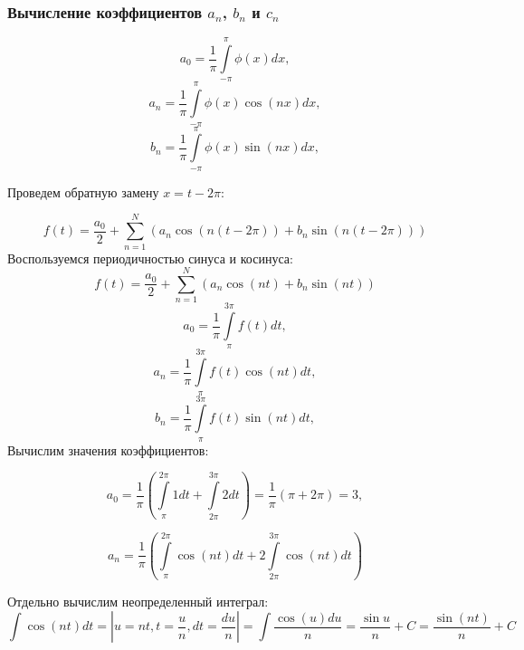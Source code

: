 \documentclass[a5paper, 10pt]{article}
\theoremstyle{definition}
\theoremstyle{plain}
\theoremstyle{remark}
\begin{document}
\subsubsection{Вычисление коэффициентов $a_n$, $b_n$ и $c_n$}
\begin{equation}
a_0 = \frac{1}{\pi} \int \limits_{-\pi}^{\pi} \phi (x) dx,
\end{equation}
\begin{equation}
a_n = \frac{1}{\pi} \int \limits_{-\pi}^{\pi} \phi (x) \cos (n x) dx,
\end{equation}
\begin{equation}
b_n = \frac{1}{\pi} \int \limits_{-\pi}^{\pi} \phi (x) \sin (nx) dx,
\end{equation}

Проведем обратную замену $x = t - 2\pi$:

\begin{equation}
f(t) = \frac{a_0}{2} + \sum  \limits_{n=1}^N \left( a_n \cos \left( n ( t - 2\pi) \right) + b_n \sin \left( n ( t - 2\pi) \right)  \right)
\end{equation}
Воспользуемся периодичностью синуса и косинуса:
\begin{equation}
f(t) = \frac{a_0}{2} + \sum  \limits_{n=1}^N \left( a_n \cos \left( n t  \right) + b_n \sin \left( n  t  \right)  \right)
\end{equation}
\begin{equation}
a_0 = \frac{1}{\pi} \int \limits_{\pi}^{3\pi} f(t) dt,
\end{equation}
\begin{equation}
a_n = \frac{1}{\pi} \int \limits_{\pi}^{3\pi} f(t) \cos (n t) dt,
\end{equation}
\begin{equation}
b_n = \frac{1}{\pi} \int \limits_{\pi}^{3\pi} f(t) \sin (nt) dt,
\end{equation}
Вычислим значения коэффициентов:

\begin{equation}
a_0 = \frac{1}{\pi} \left( \int \limits_{\pi}^{2\pi} 1 dt + \int \limits_{2\pi}^{3\pi} 2 dt\right) =
 \frac{1}{\pi} \left( \pi + 2\pi \right) = 3,
\end{equation}

\begin{equation}
a_n = \frac{1}{\pi} \left( \int \limits_{\pi}^{2\pi} \cos (n t) dt +  2\int \limits_{2\pi}^{3\pi} \cos (n t) dt \right)
\end{equation}

Отдельно вычислим неопределенный интеграл:
\begin{equation}
\int \cos (n t) dt = \left| u = nt , t = \frac{u}{n},  dt = \frac{du}{n}\right| = \int  \frac{ \cos (u) du}{n} = \frac{\sin u}{n} + C = \frac{\sin (nt)}{n} + C
\end{equation}
\end{document}
